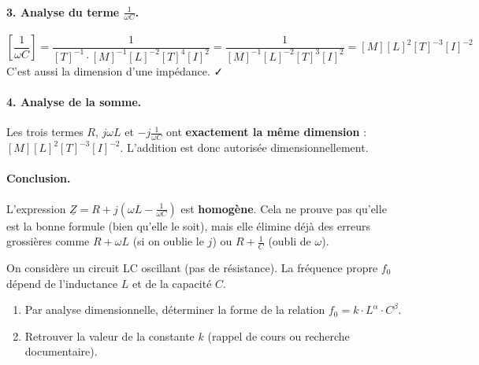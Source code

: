 \documentclass[11pt]{article}
\begin{document}
\begin{exoresolu}
\paragraph{3. Analyse du terme $\frac{1}{\omega C}$.}
\[
\left[\frac{1}{\omega C}\right] = \frac{1}{[T]^{-1} \cdot [M]^{-1}[L]^{-2}[T]^{4}[I]^{2}} = \frac{1}{[M]^{-1}[L]^{-2}[T]^{3}[I]^{2}} = [M][L]^2[T]^{-3}[I]^{-2}
\]
C'est aussi la dimension d'une impédance. ✓

\paragraph{4. Analyse de la somme.}
Les trois termes $R$, $j\omega L$ et $-j\frac{1}{\omega C}$ ont \textbf{exactement la même dimension} : $[M][L]^2[T]^{-3}[I]^{-2}$.
L'addition est donc autorisée dimensionnellement.

\paragraph{Conclusion.}
L'expression $\underline{Z} = R + j\left(\omega L - \frac{1}{\omega C}\right)$ est \textbf{homogène}. Cela ne prouve pas qu'elle est la bonne formule (bien qu'elle le soit), mais elle élimine déjà des erreurs grossières comme $R + \omega L$ (si on oublie le $j$) ou $R + \frac{1}{C}$ (oubli de $\omega$).
\end{exoresolu}

\begin{exercice}
On considère un circuit LC oscillant (pas de résistance). La fréquence propre $f_0$ dépend de l'inductance $L$ et de la capacité $C$.
\begin{enumerate}
    \item Par analyse dimensionnelle, déterminer la forme de la relation $f_0 = k \cdot L^{\alpha} \cdot C^{\beta}$.
    \item Retrouver la valeur de la constante $k$ (rappel de cours ou recherche documentaire).
\end{enumerate}

\end{exercice}
\end{document}
